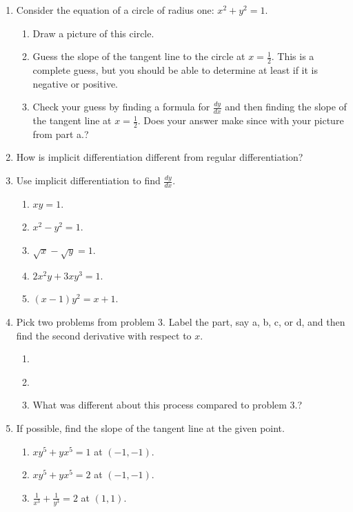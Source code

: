\documentclass[letterpaper,11pt]{article}
\begin{document}

\begin{enumerate}
\item Consider the equation of a circle of radius one: $x^2 + y^2 = 1$.
\begin{enumerate}[label = \alph*.]
    \item Draw a picture of this circle.
    \vfill
    \item Guess the slope of the tangent line to the circle at $x=\frac{1}{2}$. This is a complete guess, but you should be able to determine at least if it is negative or positive.
    \vfill
    \item Check your guess by finding a formula for $\frac{dy}{dx}$ and then finding the slope of the tangent line at $x=\frac{1}{2}$. Does your answer make since with your picture from part a.?
    \vfill
\end{enumerate}
\item How is implicit differentiation different from regular differentiation?
\vfill
\newpage
\item Use implicit differentiation to find $\frac{dy}{dx}$.
\begin{enumerate}[label = \alph*.]
    \item $xy = 1$.
    \vfill
    \item $x^2 - y^2 = 1$.
    \vfill
    \item $\sqrt{x} - \sqrt{y} = 1$.
    \vfill
    \item $2x^2 y + 3xy^3 = 1$.
    \vfill
    \newpage
    \item $(x-1)y^2 = x + 1$.
    \vfill
\end{enumerate}
\item Pick two problems from problem 3. Label the part, say a, b, c, or d, and then find the second derivative with respect to $x$.
\begin{enumerate}[label = \alph*.]
    \item \ 
    \vfill
    \item \ 
    \vfill
    \item What was different about this process compared to problem 3.?
    \vfill
\end{enumerate}
\newpage
\item If possible, find the slope of the tangent line at the given point.
\begin{enumerate}[label = \alph*.]
    \item $xy^5 + yx^5 = 1$ at $(-1,-1)$.
    \vfill
    \item $xy^5 + yx^5 = 2$ at $(-1,-1)$.
    \vfill
    \item $\frac{1}{x^3} + \frac{1}{y^3} = 2$ at $(1,1)$.
    \vfill
    
\end{enumerate}
\end{enumerate}
\end{document}
